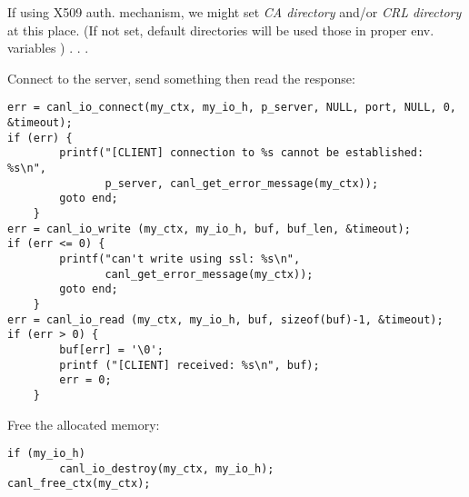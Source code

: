 If using X509 auth. mechanism, we might set \textit{CA directory} and/or
 \textit{CRL directory} at this place. (If not set, default directories
will be used \Ie those in proper env. variables )
.
.
.

Connect to the server, send something then read the response:

\begin{lstlisting}
err = canl_io_connect(my_ctx, my_io_h, p_server, NULL, port, NULL, 0, &timeout);
if (err) {
        printf("[CLIENT] connection to %s cannot be established: %s\n",
               p_server, canl_get_error_message(my_ctx));
        goto end;
    }
err = canl_io_write (my_ctx, my_io_h, buf, buf_len, &timeout);
if (err <= 0) {
        printf("can't write using ssl: %s\n",
               canl_get_error_message(my_ctx));
        goto end;
    }
err = canl_io_read (my_ctx, my_io_h, buf, sizeof(buf)-1, &timeout);
if (err > 0) {
        buf[err] = '\0';
        printf ("[CLIENT] received: %s\n", buf);
        err = 0;
    }
\end{lstlisting}

Free the allocated memory:

\begin{lstlisting}
if (my_io_h)
        canl_io_destroy(my_ctx, my_io_h);
canl_free_ctx(my_ctx);
\end{lstlisting}

